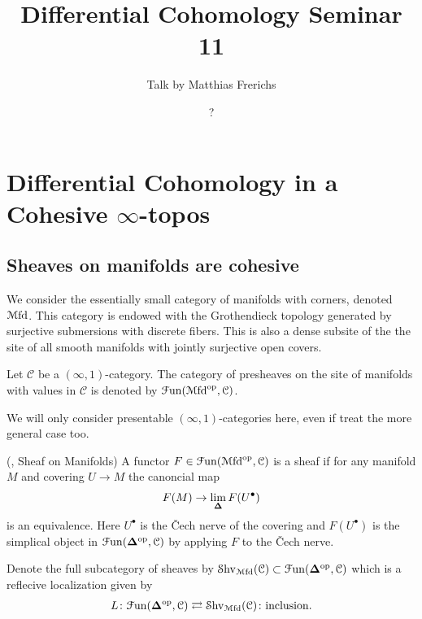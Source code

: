 \documentclass[10pt]{amsart}
\title{Differential Cohomology Seminar 11}
\date{?}
\author{Talk by Matthias Frerichs}
\begin{document}
\maketitle

\section{Differential Cohomology in a Cohesive \texorpdfstring{$\infty$}{oo}-topos}

\subsection{Sheaves on manifolds are cohesive}

We consider the essentially small category of manifolds with corners,
denoted $\mathcal{M}\mathrm{fd}$. This category is endowed with the Grothendieck
topology generated by surjective submersions with discrete fibers.
This is also a dense subsite of the the site of all smooth manifolds
with jointly surjective open covers.

\begin{definition}
  Let $\mathcal{C}$ be a $(\infty,1)$-category. The category of
  presheaves on the site of manifolds with values in $\mathcal{C}$ is
  denoted by $\mathcal{F}\mathrm{un}(\mathcal{M}\mathrm{fd}^\mathrm{op}, \mathcal{C})$.
\end{definition}

We will only consider presentable $(\infty, 1)$-categories here, even
if \cite{bunkenikolausvoelkl2016diffcoh} treat the more general case too.

\begin{definition}
  (\cite[Def. 2.3.]{bunkenikolausvoelkl2016diffcoh}, Sheaf on Manifolds)
  A functor $F\in \mathcal{F}\mathrm{un}(\mathcal{M}\mathrm{fd}^\mathrm{op}, \mathcal{C})$ is a sheaf if
  for any manifold $M$ and covering $U\rightarrow M$ the canoncial map
  \begin{align*}
    F(M) \rightarrow \lim_{\bm{\Delta}}F(U^\bullet)
  \end{align*}
  is an equivalence. Here $U^\bullet$ is the {\v C}ech nerve of the
  covering and $F(U^\bullet)$ is the simplical object in
  $\mathcal{F}\mathrm{un}(\bm{\Delta}^\mathrm{op}, \mathcal{C})$ by applying $F$ to the {\v
    C}ech nerve.

  Denote the full subcategory of sheaves by $\mathcal{S}\mathrm{hv}_{\mathcal{M}\mathrm{fd}}(\mathcal{C})
  \subset \mathcal{F}\mathrm{un}(\bm{\Delta}^\mathrm{op}, \mathcal{C})$ which is a reflecive
  localization given by
  \begin{align*}
    L \colon \mathcal{F}\mathrm{un}(\bm{\Delta}^\mathrm{op}, \mathcal{C})
    \rightleftarrows \mathcal{S}\mathrm{hv}_{\mathcal{M}\mathrm{fd}}(\mathcal{C}) \colon \mathrm{inclusion}.
  \end{align*}
\end{definition}
\end{document}
